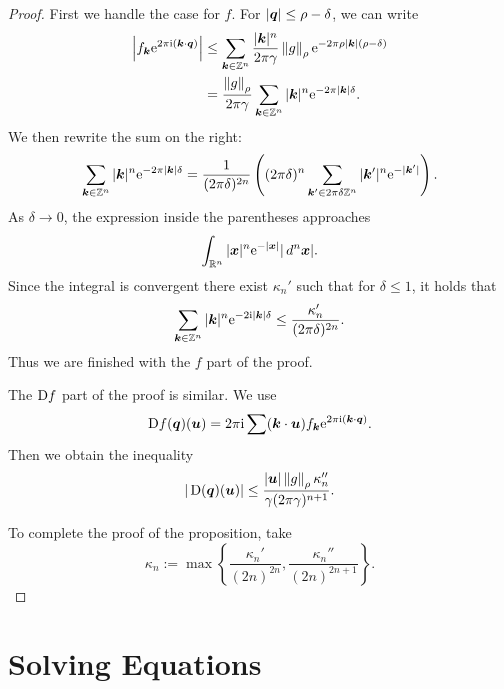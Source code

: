 \documentclass[twoside,letterpaper,10pt]{article}
\numberwithin{equation}{section}
\begin{document}
\begin{proof}
  First we handle the case for $f$.
  For $|\bm{q}| \leq \rho - \delta$, we can write
  \begin{align*}
    \left| f_{\bp{k}} \e^{2 \pi \i (\bp{k} \cdot \bp{q})} \right|
    &\leq \sum_{\bp{k} \in \Z^n} \frac{|\bp{k}|^n}{2\pi\gamma} \norm{g}_{\rho}
      \e^{-2 \pi \rho |\bp{k}|(\rho - \delta)}\\
    &= \frac{\norm{g}_{\rho}}{2 \pi \gamma} \sum_{\bp{k} \in \Z^n} |\bp{k}|^n
      \e^{-2 \pi |\bp{k}|\delta}.
  \end{align*}
  We then rewrite the sum on the right:
  \begin{equation*}
    \sum_{\bm{k} \in \mathbb{Z}^n} |\bm{k}|^n \mathrm{e}^{-2 \pi |\bm{k}|\delta} = \frac{1}{(2
      \pi \delta)^{2n}} \left((2 \pi \delta)^n \sum_{\bm{k}' \in 2 \pi \delta
        \mathbb{Z}^n} |\bm{k}'|^n \mathrm{e}^{-|\bm{k}'|} \right).
  \end{equation*}
  As $\delta \to 0$, the expression inside the parentheses approaches
  \begin{equation*}
    \int_{\mathbb{R}^n} |\bm{x}|^n \mathrm{e}^{-|\bm{x}|} |\mathop{}\!d^n \bm{x}|.
  \end{equation*}
  Since the integral is convergent there exist $\kappa_n'$ such that for $\delta
  \leq 1$, it holds that
  \begin{equation*}
    \sum_{\bm{k} \in \mathbb{Z}^n} |\bm{k}|^n \mathrm{e}^{-2 \mathrm{i} |\bm{k}|\delta} \leq
    \frac{\kappa_n'}{(2 \pi \delta)^{2n}}.
  \end{equation*}
  Thus we are finished with the $f$ part of the proof.

  The $\mathop{}\!\mathrm{D} f$ part of the proof is similar.
  We use
  \begin{equation*}
    \mathop{}\!\mathrm{D} f(\bm{q})(\bm{u}) = 2 \pi \mathrm{i} \sum(\bm{k} \cdot \bm{u}) f_{\bm{k}} \mathrm{e}^{2
      \pi \mathrm{i} (\bm{k} \cdot \bm{q})}.
  \end{equation*}
  Then we obtain the inequality
  \begin{equation*}
    |\Dif(\bp{q})(\bp{u})| \leq \frac{|\bp{u}| \norm{g}_{\rho}
      \kappa_n''}{\gamma(2 \pi \gamma)^{n+1}}.
  \end{equation*}

  To complete the proof of the proposition, take
  \begin{equation*}
    \kappa_n := \max \left\{\frac{\kappa_n'}{(2n)^{2n}},
      \frac{\kappa_n''}{(2n)^{2n+1}}\right\}.
  \end{equation*}
\end{proof}

\section{Solving Equations}
\label{sec:solving-equations}
\end{document}
